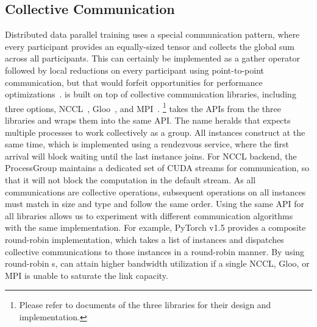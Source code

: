 \subsection{Collective Communication}\label{sec:collective}

Distributed data parallel training uses a special communication pattern, where every participant provides an equally-sized tensor and collects the global sum across all participants. This can certainly be implemented as a gather operator followed by local reductions on every participant using point-to-point communication, but that would forfeit opportunities for performance optimizations~\cite{nccl:tree_reduce}.  is built on top of collective communication libraries, including three options, NCCL~\cite{nccl}, Gloo~\cite{gloo}, and MPI~\cite{mpi}. \footnote{Please refer to documents of the three libraries for their design and implementation.}  takes the APIs from the three libraries and wraps them into the same  API. The name heralds that  expects multiple processes to work collectively as a group. All  instances construct at the same time, which is implemented using a rendezvous service, where the first arrival will block waiting until the last instance joins. For NCCL backend, the ProcessGroup maintains a dedicated set of CUDA streams for communication, so that it will not block the computation in the default stream. As all communications are collective operations, subsequent operations on all  instances must match in size and type and follow the same order. Using the same  API for all libraries allows us to experiment with different communication algorithms with the same  implementation. For example, PyTorch v1.5 provides a composite round-robin  implementation, which takes a list of  instances and dispatches collective communications to those  instances in a round-robin manner. By using round-robin s,  can attain higher bandwidth utilization if a single NCCL, Gloo, or MPI  is unable to saturate the link capacity. 
